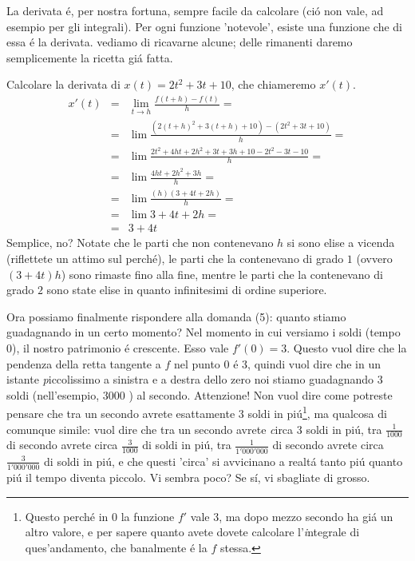 La derivata \'e, per nostra fortuna, sempre facile da calcolare (ci\'o non vale, ad esempio per gli integrali). Per ogni funzione 'notevole',
esiste una funzione che di essa \'e la derivata. vediamo di ricavarne alcune; delle rimanenti daremo semplicemente la ricetta gi\'a fatta.

\begin{esercizio}
Calcolare la derivata di $x(t)=2t^2+3t+10$, che chiameremo $x'(t)$.
\begin{eqnarray}[rcl]
 x'(t) & = & \lim_{t \longrightarrow h} \frac{f(t+h)-f(t)}{h} = \\
       & = & \lim \frac{(2(t+h)^2+3(t+h)+10)-(2t^2+3t+10)}{h} = \\
       & = & \lim \frac{2t^2+4ht+2h^2+3t+3h+10-2t^2-3t-10}{h}= \\
       & = & \lim \frac{4ht+2h^2+3h}{h}= \\
       & = & \lim \frac{(h)(3+4t+2h)}{h}= \\
       & = & \lim 3+4t+2h= \\
       & = & 3+4t
\end{eqnarray}
Semplice, no? Notate che le parti che non contenevano $h$ si sono elise a vicenda (riflettete un attimo
sul perch\'e), le parti che la contenevano di grado $1$ (ovvero $(3+4t)h$) sono rimaste fino alla fine,
mentre le parti che la contenevano di grado $2$ sono state elise in quanto infinitesimi di ordine superiore.
\end{esercizio}

Ora possiamo finalmente rispondere alla domanda (5): quanto stiamo guadagnando in un certo momento?
Nel momento in cui versiamo i soldi (tempo $0$), il nostro patrimonio \'e crescente. Esso vale $f'(0)=3$.
Questo vuol dire che la pendenza della retta tangente a $f$ nel punto $0$ \'e $3$, quindi vuol dire che in
un istante {\emph piccolissimo} a sinistra e a destra dello zero noi stiamo guadagnando $3$ soldi (nell'esempio,
$3000$ \EUR) al secondo. Attenzione! Non vuol dire come potreste pensare che tra un secondo avrete esattamente
$3$ soldi in pi\'u\footnote{Questo perch\'e in $0$ la funzione $f'$ vale $3$, ma dopo mezzo secondo ha gi\'a
un altro valore, e per sapere quanto avete dovete calcolare l'{\emph integrale} di ques'andamento, che banalmente
\'e la $f$ stessa.}, ma qualcosa di comunque simile: vuol dire che tra un secondo avrete {\emph circa} $3$ soldi
in pi\'u, tra $\frac{1}{1000}$ di secondo avrete circa $\frac{3}{1000}$ di soldi in pi\'u, tra $\frac{1}{1'000'000}$
di secondo avrete circa $\frac{3}{1'000'000}$ di soldi in pi\'u, e che questi 'circa' si avvicinano a realt\'a
tanto pi\'u quanto pi\'u il tempo diventa piccolo. Vi sembra poco? Se s\'i, vi sbagliate di grosso.

